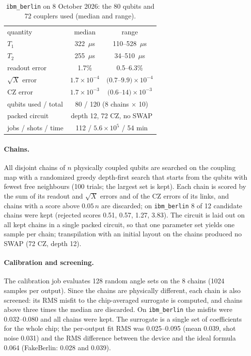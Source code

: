 \documentclass[floatfix,aps,pra,twocolumn,superscriptaddress,10pt,nofootinbib]{revtex4-2}
\begin{document}
\begin{appendices}
\begin{table}[b]
\caption{\justifying \texttt{ibm\_berlin} on 8 October 2026: the 80 qubits and 72 couplers used (median and range).}
\label{tab:device}
\setlength{\tabcolsep}{4pt}
\footnotesize
\begin{ruledtabular}
\begin{tabular}{lcc}
quantity & median & range\\
\colrule
$T_1$ & 322~$\mu$s & 110--528~$\mu$s\\
$T_2$ & 255~$\mu$s & 34--510~$\mu$s\\
readout error & 1.7\% & 0.5--6.3\%\\
$\sqrt X$ error & $1.7\times10^{-4}$ & $(0.7$--$9.9)\times10^{-4}$\\
CZ error & $1.7\times10^{-3}$ & $(0.6$--$14)\times10^{-3}$\\
\colrule
qubits used / total & \multicolumn{2}{c}{80 / 120 (8 chains $\times$ 10)}\\
packed circuit & \multicolumn{2}{c}{depth 12, 72 CZ, no SWAP}\\
jobs / shots / time & \multicolumn{2}{c}{112 / $5.6\times10^5$ / 54 min}\\
\end{tabular}
\end{ruledtabular}
\end{table}

\paragraph{Chains.} All disjoint chains of $n$ physically coupled qubits are searched on the coupling map with a randomized greedy depth-first search that starts from the qubits with fewest free neighbours (100 trials; the largest set is kept). Each chain is scored by the sum of its readout and $\sqrt X$ errors and of the CZ errors of its links, and chains with a score above $0.05\,n$ are discarded; on \texttt{ibm\_berlin} 8 of 12 candidate chains were kept (rejected scores 0.51, 0.57, 1.27, 3.83). The circuit is laid out on all kept chains in a single packed circuit, so that one parameter set yields one sample per chain; transpilation with an initial layout on the chains produced no SWAP (72 CZ, depth 12).

\paragraph{Calibration and screening.} The calibration job evaluates 128 random angle sets on the 8 chains (1024 samples per output). Since the chains are physically different, each chain is also screened: its RMS misfit to the chip-averaged surrogate is computed, and chains above three times the median are discarded. On \texttt{ibm\_berlin} the misfits were 0.032--0.080 and all chains were kept. The surrogate is a single set of coefficients for the whole chip; the per-output fit RMS was 0.025--0.095 (mean 0.039, shot noise 0.031) and the RMS difference between the device and the ideal formula 0.064 (FakeBerlin: 0.028 and 0.039).


\end{appendices}
\end{document}
